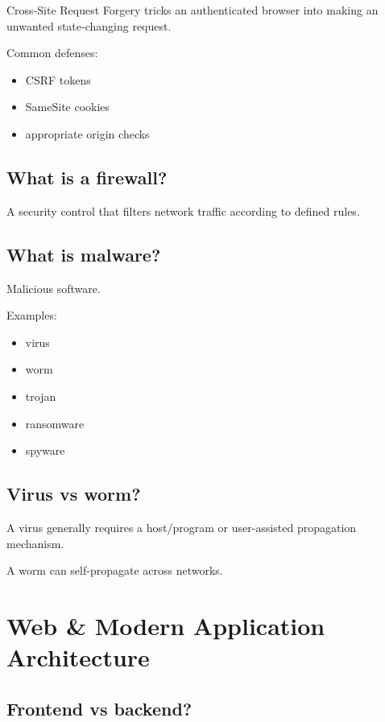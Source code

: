 Cross-Site Request Forgery tricks an authenticated browser into making an unwanted state-changing request.

Common defenses:

\begin{itemize}
  \item CSRF tokens
  \item SameSite cookies
  \item appropriate origin checks
\end{itemize}

\medskip

\subsection{What is a firewall?}

A security control that filters network traffic according to defined rules.

\medskip

\subsection{What is malware?}

Malicious software.

Examples:

\begin{itemize}
  \item virus
  \item worm
  \item trojan
  \item ransomware
  \item spyware
\end{itemize}

\medskip

\subsection{Virus vs worm?}

A virus generally requires a host/program or user-assisted propagation mechanism.

A worm can self-propagate across networks.

\medskip

\section{Web \& Modern Application Architecture}

\subsection{Frontend vs backend?}

